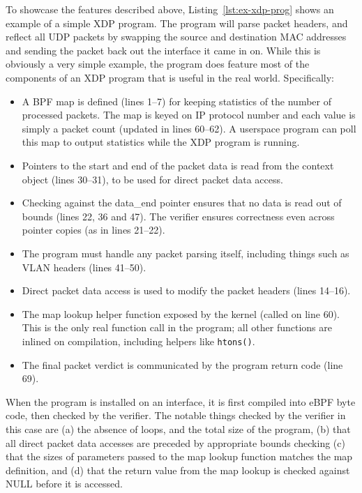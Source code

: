 \documentclass[sigconf]{acmart}
\begin{document}
To showcase the features described above, Listing~\ref{lst:ex-xdp-prog} shows an
example of a simple XDP program. The program will parse packet headers, and
reflect all UDP packets by swapping the source and destination MAC addresses and
sending the packet back out the interface it came in on. While this is obviously
a very simple example, the program does feature most of the components of an XDP
program that is useful in the real world. Specifically:

\begin{itemize}
\item A BPF map is defined (lines 1--7) for keeping statistics of the number of
  processed packets. The map is keyed on IP protocol number and each value is
  simply a packet count (updated in lines 60--62). A userspace program can poll
  this map to output statistics while the XDP program is running.
\item Pointers to the start and end of the packet data is read from the context
  object (lines 30--31), to be used for direct packet data access.
\item Checking against the data\_end pointer ensures that no data is read out of
  bounds (lines 22, 36 and 47). The verifier ensures correctness even across
  pointer copies (as in lines 21--22).
\item The program must handle any packet parsing itself, including things such
  as VLAN headers (lines 41--50).
\item Direct packet data access is used to modify the packet headers (lines
  14--16).
\item The map lookup helper function exposed by the kernel (called on line 60).
  This is the only real function call in the program; all other functions are
  inlined on compilation, including helpers like \texttt{htons()}.
\item The final packet verdict is communicated by the program return code (line
  69).
\end{itemize}


When the program is installed on an interface, it is first compiled into eBPF
byte code, then checked by the verifier. The notable things checked by the
verifier in this case are (a) the absence of loops, and the total size of the
program, (b) that all direct packet data accesses are preceded by appropriate
bounds checking (c) that the sizes of parameters passed to the map lookup
function matches the map definition, and (d) that the return value from the map
lookup is checked against NULL before it is accessed.
\end{document}
